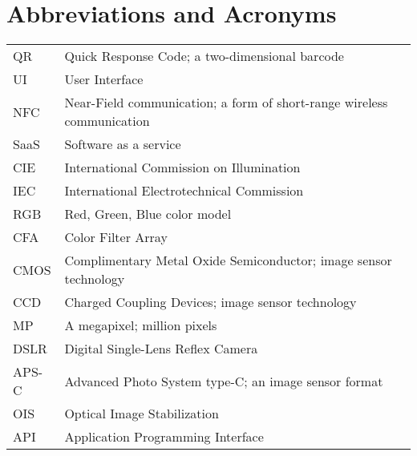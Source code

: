 \documentclass[thesis.tex]{subfiles}
\begin{document}
\chapter*{Abbreviations and Acronyms}

\noindent
\begin{longtable}{@{}p{}p{}@{}}
QR & Quick Response Code; a two-dimensional barcode \\
UI & User Interface \\
NFC & Near-Field communication; a form of short-range wireless communication \\
SaaS & Software as a service \\
CIE & International Commission on Illumination \\
IEC & International Electrotechnical Commission \\
RGB & Red, Green, Blue color model \\
CFA & Color Filter Array \\
CMOS & Complimentary Metal Oxide Semiconductor; image sensor technology \\
CCD & Charged Coupling Devices; image sensor technology \\
MP & A megapixel; million pixels \\
DSLR & Digital Single-Lens Reflex Camera \\
APS-C & Advanced Photo System type-C; an image sensor format \\
OIS & Optical Image Stabilization \\
API & Application Programming Interface

\end{longtable}
\end{document}
